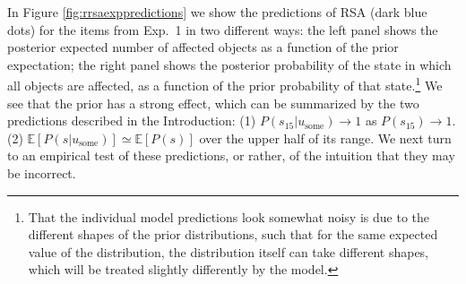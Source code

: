 \documentclass[10pt,letterpaper]{article}
\newcommand{\red}[1]{\textcolor{Red}{#1}}
\begin{document}
In Figure \ref{fig:rrsaexppredictions} we show the predictions of RSA (dark blue dots) for the items from Exp.~1 in two different ways: the left panel shows the posterior expected number of affected objects as a function of the prior expectation; the right panel shows the posterior probability of the state in which all objects are affected, as a function of the prior probability of that state.\footnote{That the individual model predictions look somewhat noisy is due to the different shapes of the prior distributions, such that for the same expected value of the distribution, the distribution itself can take different shapes, which will be treated slightly differently by the model.}   %
We see that the prior has a strong effect, which can be summarized by the two predictions described in the Introduction: 
(1) $P(s_{15}|u_{\textrm{some}}) \rightarrow 1$ as $P(s_{15})\rightarrow 1$. 
(2) $\mathbb{E}[P(s|u_{\textrm{some}})] \simeq \mathbb{E}[P(s)]$ over the upper half of its range. 
We next turn to an empirical test of these predictions, or rather, of the intuition that they may be incorrect.
\end{document}
